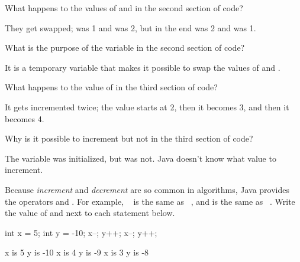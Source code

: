 \Q What happens to the values of  and  in the second section of code?

\begin{answer}
They get swapped;  was 1 and  was 2, but in the end  was 2 and  was 1.
\end{answer}


\Q What is the purpose of the variable  in the second section of code?

\begin{answer}
It is a temporary variable that makes it possible to swap the values of  and .
\end{answer}


\Q What happens to the value of  in the third section of code?

\begin{answer}
It gets incremented twice; the value starts at 2, then it becomes 3, and then it becomes 4.
\end{answer}


\Q Why is it possible to increment  but not  in the third section of code?

\begin{answer}
The variable  was initialized, but  was not.
Java doesn't know what value to increment.
\end{answer}


\Q Because \emph{increment} and \emph{decrement} are so common in algorithms, Java provides the operators \java{++} and \java{--}.
For example, ~ is the same as ~, and  is the same as ~.
Write the value of  and  next to each statement below.

\vspace{-1ex}
\hspace{2em}
\begin{minipage}[t]{100pt}
\begin{javalst}
int x = 5;
int y = -10;
x--;
y++;
x--;
y++;
\end{javalst}
\end{minipage}
\begin{minipage}[t]{100pt}
\begin{answer}[8em]
\begin{javaans}
x is 5
y is -10
x is 4
y is -9
x is 3
y is -8
\end{javaans}
\end{answer}
\end{minipage}


